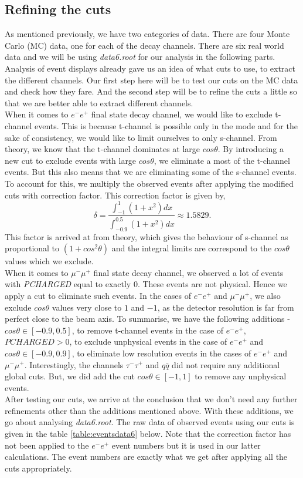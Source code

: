 \subsection{Refining the cuts}
As mentioned previously, we have two categories of data. There are four Monte Carlo (MC) data, one for each of the decay channels. There are six real world data and we will be using \textit{data6.root} for our analysis in the following parts. Analysis of event displays already gave us an idea of what cuts to use, to extract the different channels. Our first step here will be to test our cuts on the MC data and check how they fare. And the second step will be to refine the cuts a little so that we are better able to extract different channels.\\
When it comes to $e^-e^+$ final state decay channel, we would like to exclude t-channel events. This is because t-channel is possible only in the mode and for the sake of consistency, we would like to limit ourselves to only s-channel. From theory\cite{UB}, we know that the t-channel dominates at large $cos\theta$. By introducing a new cut to exclude events with large $cos\theta$, we eliminate a most of the t-channel events. But this also means that we are eliminating some of the s-channel events. To account for this, we multiply the observed events after applying the modified cuts with correction factor. This correction factor is given by,
\begin{equation}
    \delta = \frac{\int_{-1}^1 (1 + x^2) dx}{\int_{-0.9}^{0.5} (1 + x^2) dx} \approx 1.5829.
\end{equation}
This factor is arrived at from theory, which gives the behaviour of s-channel as proportional to $(1 + cos^2\theta)$ and the integral limits are correspond to the $cos\theta$ values which we exclude.\\
When it comes to $\mu^-\mu^+$ final state decay channel, we observed a lot of events with \textit{PCHARGED} equal to exactly $0$. These events are not physical. Hence we apply a cut to eliminate such events. In the cases of $e^-e^+$ and $\mu^-\mu^+$, we also exclude $cos\theta$ values very close to $1$ and $-1$, as the detector resolution is far from perfect close to the beam axis. To summarise, we have the following additions - $cos\theta \in [-0.9, 0.5]$, to remove t-channel events in the case of $e^-e^+$, $PCHARGED > 0$, to exclude unphysical events in the case of $e^-e^+$ and $cos\theta \in [-0.9, 0.9]$, to eliminate low resolution events in the cases of $e^-e^+$ and $\mu^-\mu^+$. Interestingly, the channels $\tau^-\tau^+$ and $q\bar{q}$ did not require any additional global cuts. But, we did add the cut $cos\theta \in [-1, 1]$ to remove any unphysical events.\\
After testing our cuts, we arrive at the conclusion that we don't need any further refinements other than the additions mentioned above. With these additions, we go about analysing \textit{data6.root}. The raw data of observed events using our cuts is given in the table \ref{table:eventsdata6} below. Note that the correction factor has not been applied to the $e^-e^+$ event numbers but it is used in our latter calculations. The event numbers are exactly what we get after applying all the cuts appropriately.

